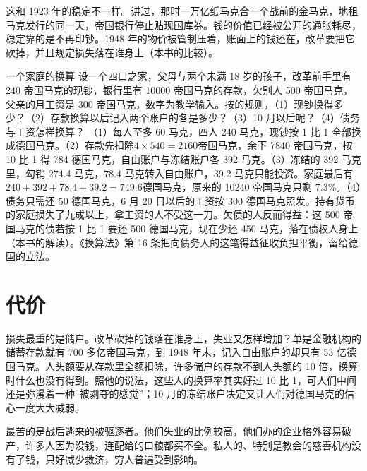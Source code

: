 这和 1923 年的稳定不一样。讲过，那时一万亿纸马克合一个战前的金马克，地租马克发行的同一天，帝国银行停止贴现国库券。钱的价值已经被公开的通胀耗尽，稳定靠的是不再印钞。1948 年的物价被管制压着，账面上的钱还在，改革要把它砍掉，并且规定损失落在谁身上（本书的比较）。

\begin{example}{一个家庭的换算}\label{ex:reconstruction-household}
设一个四口之家，父母与两个未满 18 岁的孩子，改革前手里有 240 帝国马克的现钞，银行里有 10000 帝国马克的存款，欠别人 500 帝国马克，父亲的月工资是 300 帝国马克，数字为教学输入。按的规则，（1）现钞换得多少？（2）存款换算以后记入两个账户的各是多少？（3）10 月以后呢？（4）债务与工资怎样换算？
\solution
（1）每人至多 60 马克，四人 240 马克，现钞按 1 比 1 全部换成德国马克。（2）存款先扣除$4\times540=2160$帝国马克，余下 7840 帝国马克，按 10 比 1 得 784 德国马克，自由账户与冻结账户各 392 马克。（3）冻结的 392 马克里，勾销 274.4 马克，78.4 马克转入自由账户，39.2 马克只能投资。家庭最后有$240+392+78.4+39.2=749.6$德国马克，原来的 10240 帝国马克只剩 7.3\%。（4）债务只需还 50 德国马克，6 月 20 日以后的工资按 300 德国马克照发。持有货币的家庭损失了九成以上，拿工资的人不受这一刀。欠债的人反而得益：这 500 帝国马克的债若按 1 比 1 要还 500 德国马克，现在少还 450 马克，落在债权人身上（本书的解读）。《换算法》第 16 条把向债务人的这笔得益征收负担平衡，留给德国的立法\cite{umstellungsgesetz1948}。
\end{example}

\section{代价}\label{sec:reconstruction-cost}

损失最重的是储户。改革砍掉的钱落在谁身上，失业又怎样增加？单是金融机构的储蓄存款就有 700 多亿帝国马克，到 1948 年末，记入自由账户的却只有 53 亿德国马克\cite{buchheim1988}。人头额要从存款里全额扣除，许多储户的存款不到人头额的 10 倍，换算时什么也没有得到\cite{buchheim1988}。照他的说法，这些人的换算率其实好过 10 比 1，可人们中间还是弥漫着一种“被剥夺的感觉”；10 月的冻结账户决定又让人们对德国马克的信心一度大大减弱\cite{buchheim1988}。

最苦的是战后逃来的被驱逐者。他们失业的比例较高，他们办的企业格外容易破产，许多人因为没钱，连配给的口粮都买不全\cite{buchheim1988}。私人的、特别是教会的慈善机构没有了钱，只好减少救济，穷人普遍受到影响\cite{buchheim1988}。

